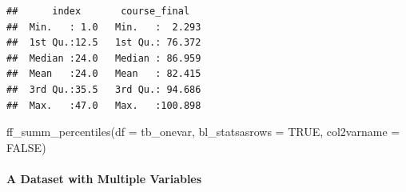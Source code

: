 \documentclass[
]{book}
\newenvironment{Shaded}{\begin{snugshade}}{\end{snugshade}}
\newcommand{\AttributeTok}[1]{\textcolor[rgb]{0.77,0.63,0.00}{#1}}
\newcommand{\ConstantTok}[1]{\textcolor[rgb]{0.00,0.00,0.00}{#1}}
\newcommand{\FunctionTok}[1]{\textcolor[rgb]{0.00,0.00,0.00}{#1}}
\newcommand{\NormalTok}[1]{#1}
\begin{document}
\begin{verbatim}
##      index       course_final    
##  Min.   : 1.0   Min.   :  2.293  
##  1st Qu.:12.5   1st Qu.: 76.372  
##  Median :24.0   Median : 86.959  
##  Mean   :24.0   Mean   : 82.415  
##  3rd Qu.:35.5   3rd Qu.: 94.686  
##  Max.   :47.0   Max.   :100.898
\end{verbatim}

\begin{Shaded}
\begin{Highlighting}[]
\FunctionTok{ff\_summ\_percentiles}\NormalTok{(}\AttributeTok{df =}\NormalTok{ tb\_onevar, }\AttributeTok{bl\_statsasrows =} \ConstantTok{TRUE}\NormalTok{, }\AttributeTok{col2varname =} \ConstantTok{FALSE}\NormalTok{)}
\end{Highlighting}
\end{Shaded}

\hypertarget{a-dataset-with-multiple-variables}{%
\paragraph{A Dataset with Multiple Variables}\label{a-dataset-with-multiple-variables}}
\end{document}
